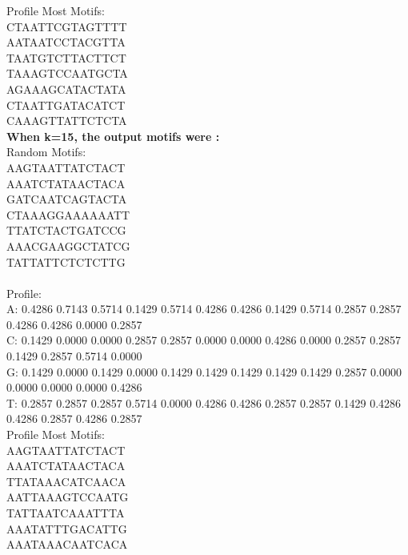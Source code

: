 \documentclass{report}
\begin{document}
Profile Most Motifs:\\
CTAATTCGTAGTTTT\\
AATAATCCTACGTTA\\
TAATGTCTTACTTCT\\
TAAAGTCCAATGCTA\\
AGAAAGCATACTATA\\
CTAATTGATACATCT\\
CAAAGTTATTCTCTA\\
\textbf{When k=15, the output motifs were :}\\
Random Motifs:\\
AAGTAATTATCTACT\\
AAATCTATAACTACA\\
GATCAATCAGTACTA\\
CTAAAGGAAAAAATT\\
TTATCTACTGATCCG\\
AAACGAAGGCTATCG\\
TATTATTCTCTCTTG\\
\\
Profile:\\
A: 0.4286 0.7143 0.5714 0.1429 0.5714 0.4286 0.4286 0.1429 0.5714 0.2857 0.2857 0.4286 0.4286 0.0000 0.2857\\
C: 0.1429 0.0000 0.0000 0.2857 0.2857 0.0000 0.0000 0.4286 0.0000 0.2857 0.2857 0.1429 0.2857 0.5714 0.0000\\
G: 0.1429 0.0000 0.1429 0.0000 0.1429 0.1429 0.1429 0.1429 0.1429 0.2857 0.0000 0.0000 0.0000 0.0000 0.4286\\
T: 0.2857 0.2857 0.2857 0.5714 0.0000 0.4286 0.4286 0.2857 0.2857 0.1429 0.4286 0.4286 0.2857 0.4286 0.2857\\

Profile Most Motifs:\\
AAGTAATTATCTACT\\
AAATCTATAACTACA\\
TTATAAACATCAACA\\
AATTAAAGTCCAATG\\
TATTAATCAAATTTA\\
AAATATTTGACATTG\\
AAATAAACAATCACA\\

\\
\end{document}
